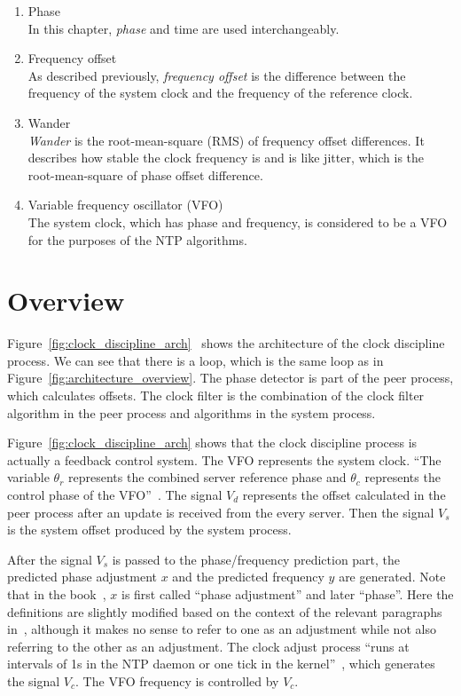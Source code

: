 \begin{enumerate}
    \item Phase\\
        In this chapter, \emph{phase} and time are used interchangeably.
    \item Frequency offset\\
        As described previously, \emph{frequency offset} is the difference
        between the frequency of the system clock and the frequency of the
        reference clock.
    \item Wander\\
        \emph{Wander} is the root-mean-square (RMS) of frequency offset
        differences.  It describes how stable the clock frequency is and is
        like jitter, which is the root-mean-square of phase offset difference.
    \item Variable frequency oscillator (VFO)\\
        The system clock, which has phase and frequency, is considered to be a
        VFO for the purposes of the NTP algorithms.
\end{enumerate}

\section{Overview}%
\label{sec:clock_discipline_overview}
Figure~\ref{fig:clock_discipline_arch}~\cite{redbook} shows the architecture of
the clock discipline process. We can see that there is a loop, which is the
same loop as in Figure~\ref{fig:architecture_overview}. The phase detector is
part of the peer process, which calculates offsets. The clock filter is the
combination of the clock filter algorithm in the peer process and algorithms in
the system process.  

Figure~\ref{fig:clock_discipline_arch} shows that the
clock discipline process is actually a feedback control system. The VFO
represents the system clock.  ``The variable $\theta_r$ represents the combined
server reference phase and $\theta_c$ represents the control phase of the
VFO''~\cite{redbook}. The signal $V_d$ represents the offset calculated in the
peer process after an update is received from the every server. Then the signal
$V_s$ is the system offset produced by the system process. 

After the signal
$V_s$ is passed to the phase/frequency prediction part, the predicted phase
adjustment $x$ and the predicted frequency $y$ are generated. Note that in the
book~\cite{redbook}, $x$ is first called ``phase adjustment'' and later
``phase''. Here the definitions are slightly modified based on the context of
the relevant paragraphs in~\cite{redbook}, although it makes no sense to refer
to one as an adjustment while not also referring to the other as an adjustment.
The clock adjust process ``runs at intervals of 1s in the NTP daemon or one
tick in the kernel''~\cite{redbook}, which generates the signal $V_c$. The VFO
frequency is controlled by $V_c$.

